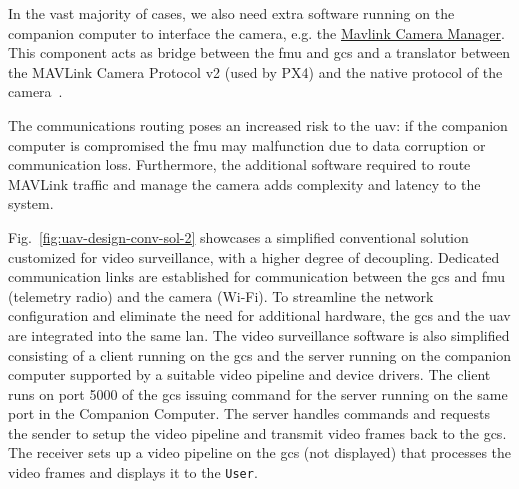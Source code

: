 In the vast majority of cases, we also need extra software running on the companion
computer to interface the camera, e.g. the \href{https://github.com/mavlink/mavlink-camera-manager}{Mavlink Camera Manager}. This
component acts as bridge between the \gls{fmu} and \gls{gcs} and a translator between the MAVLink Camera Protocol v2
(used by PX4) and the native protocol of the camera~\cite{px4-cam-managers}.

The communications routing poses an increased risk to the \gls{uav}: if the
companion computer is compromised the \gls{fmu} may malfunction due to data
corruption or communication loss. Furthermore, the additional software required
to route MAVLink traffic and manage the camera adds complexity and latency to
the system.

Fig.~\ref{fig:uav-design-conv-sol-2} showcases a simplified conventional
solution customized for video surveillance, with a higher degree of
decoupling. Dedicated
communication links are established for communication between the \gls{gcs} and \gls{fmu} (telemetry radio) and the
camera (Wi-Fi). To streamline the network configuration and eliminate the need
for additional hardware, the \gls{gcs} and the \gls{uav} are integrated into the
same \gls{lan}. The video surveillance software is also simplified consisting of
a client running on the \gls{gcs} and the server running on the companion
computer supported by a suitable video pipeline and device drivers. The
client runs on port 5000 of the \gls{gcs} issuing command for the server running
on the same port in the Companion Computer. The server handles commands and
requests the sender to setup the video pipeline and transmit video frames back
to the \gls{gcs}. The receiver sets up a video pipeline on the \gls{gcs} (not
displayed) that processes the video frames and displays it to the \texttt{User}.

